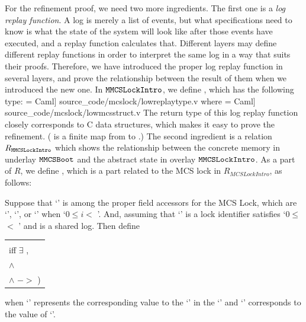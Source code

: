 For the refinement proof, we need two more ingredients.
The first one is a \emph{log replay function}.
A log is merely a list of events, but what specifications need to know is what the state of the system will look like after those events have executed,
and a replay function calculates that. 
Different layers may define different replay functions in order to interpret the same log in a way that suits their proofs.
Therefore, we have introduced the proper log replay function in several layers, and prove the relationship between the result of them when we introduced the new one.
In ${\mathrm{\texttt{MMCSLockIntro}}}$, we define , which has the following type:
 = Caml] {source_code/mcslock/lowreplaytype.v}
where
 = Caml] {source_code/mcslock/lowmcsstruct.v}
The return type of this log replay function closely corresponds to C data structures, which makes it easy to prove the refinement. ( is a finite map from  to .)
The second ingredient is a relation $R_{{\mathrm{\texttt{MMCSLockIntro}}}}$ which shows the relationship between the concrete memory in underlay ${\mathrm{\texttt{MMCSBoot}}}$ and the abstract state in overlay ${\mathrm{\texttt{MMCSLockIntro}}}$.
As a part of $R$, we define , which is a part related to 
the MCS lock in $R_{MCSLockIntro}$,  as follows:

\begin{definition}
Suppose that `' is among the proper field accessors for the MCS Lock, which are
`', `', or  `' when `$0 \leq i <$  '.
 And, assuming that `' is a lock identifier satisfies `$0 \leq$  $<$ ' and  is a shared log. Then define \newline
  \begin{tabular}{P{0.90\textwidth}}
    \\
      iff \code{(}$\exists$ , \\
       $\wedge$  \\
      $\wedge$  $->$ )
\end{tabular}\newline
    when `' represents the corresponding 
    value to the `' in the `' 
    and `' corresponds to the value of `'.
\end{definition}

